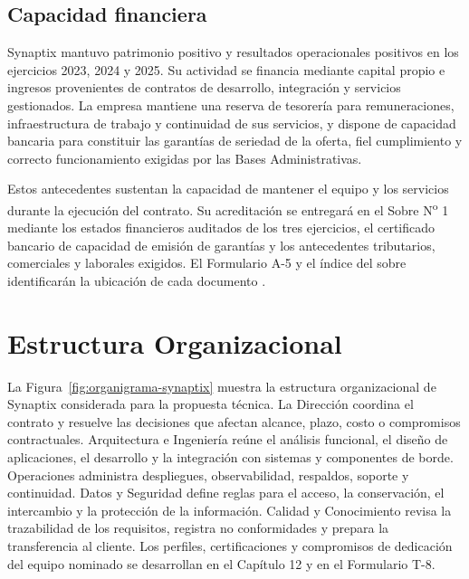 \subsection{Capacidad financiera}

Synaptix mantuvo patrimonio positivo y resultados operacionales positivos en los ejercicios 2023, 2024 y 2025. Su actividad se financia mediante capital propio e ingresos provenientes de contratos de desarrollo, integración y servicios gestionados. La empresa mantiene una reserva de tesorería para remuneraciones, infraestructura de trabajo y continuidad de sus servicios, y dispone de capacidad bancaria para constituir las garantías de seriedad de la oferta, fiel cumplimiento y correcto funcionamiento exigidas por las Bases Administrativas.

Estos antecedentes sustentan la capacidad de mantener el equipo y los servicios durante la ejecución del contrato. Su acreditación se entregará en el Sobre N\textsuperscript{o} 1 mediante los estados financieros auditados de los tres ejercicios, el certificado bancario de capacidad de emisión de garantías y los antecedentes tributarios, comerciales y laborales exigidos. El Formulario A-5 y el índice del sobre identificarán la ubicación de cada documento \parencite[arts.~34.1 y 39, pp.~22 y 25; Formulario T-7, p.~57]{bases-admin}.



\section{Estructura Organizacional}

La Figura~\ref{fig:organigrama-synaptix} muestra la estructura organizacional de Synaptix considerada para la propuesta técnica. La Dirección coordina el contrato y resuelve las decisiones que afectan alcance, plazo, costo o compromisos contractuales. Arquitectura e Ingeniería reúne el análisis funcional, el diseño de aplicaciones, el desarrollo y la integración con sistemas y componentes de borde. Operaciones administra despliegues, observabilidad, respaldos, soporte y continuidad. Datos y Seguridad define reglas para el acceso, la conservación, el intercambio y la protección de la información. Calidad y Conocimiento revisa la trazabilidad de los requisitos, registra no conformidades y prepara la transferencia al cliente. Los perfiles, certificaciones y compromisos de dedicación del equipo nominado se desarrollan en el Capítulo 12 y en el Formulario T-8.

